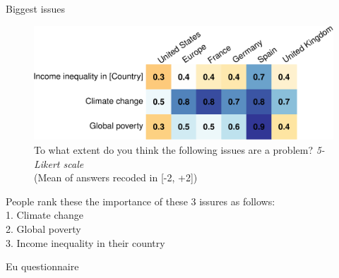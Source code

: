 \documentclass[aspectratio=169,xcolor=dvipsnames, 11pt,mathserif]{beamer}
\begin{document}
\begin{framefont}{\small}
\begin{frame}{Biggest issues \hyperlink{donation}{}\label{problems}}
    \begin{figure}
        \centering 
        \caption{To what extent do you think the following issues are a problem? \textit{5-Likert scale} \\(Mean of answers recoded in [-2, +2])
        }
        \vspace{-.2cm}
        \includegraphics[width=.7\textwidth]{../figures/country_comparison/problem_mean.pdf} 
    \end{figure}
	\bbvs \ip People rank these the importance of these 3 issures as follows: \\ 1. Climate change \\ 2. Global poverty \\ 3. Income inequality in their country
    \ee
\end{frame}

\begin{frame}{Eu questionnaire \hyperlink{questionnaires}{}\label{survey_flow}}
    \vspace{.05cm}
\end{frame}


\end{framefont}
\end{document}
